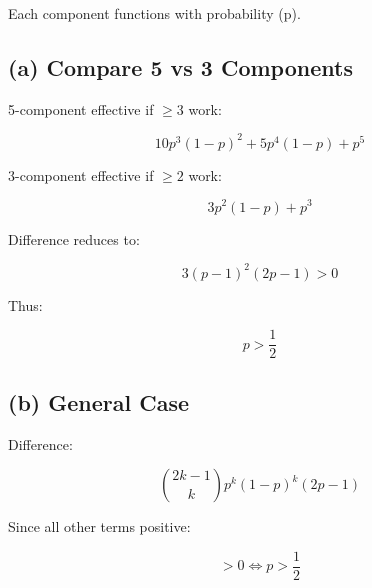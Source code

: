 \documentclass[12pt]{article}
\begin{document}
Each component functions with probability (p).

\subsection*{(a) Compare 5 vs 3 Components}

5-component effective if $\ge3$ work:

\[
10p^3(1-p)^2+5p^4(1-p)+p^5
\]

3-component effective if $\ge2$ work:

\[
3p^2(1-p)+p^3
\]

Difference reduces to:

\[
3(p-1)^2(2p-1)>0
\]

Thus:

\[
p>\frac{1}{2}
\]

\subsection*{(b) General Case}

Difference:

\[
\binom{2k-1}{k} p^k(1-p)^k (2p-1)
\]

Since all other terms positive:

\[
> 0 \iff p>\frac{1}{2}
\]
\end{document}
